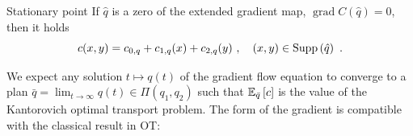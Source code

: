 \documentclass[xcolor=svgnames]{beamer}
\DeclareMathOperator{\grad}{grad}
\begin{document}
\begin{frame}
\begin{block}{Stationary point} If $\hat q$ is a zero of the extended gradient map, $\grad C(\hat q) = 0$, then it holds
\begin{equation*}
  c(x,y) = c_{0,q} + c_{1,q}(x) + c_{2,q}(y) \ , \quad  (x,y) \in \operatorname{Supp}\left(\hat q\right) \ .
\end{equation*}
\end{block}

We expect any solution $t \mapsto q(t)$ of the gradient flow equation to converge to a plan $\bar q = \lim_{t \to \infty} q(t) \in \Pi(q_1,q_2)$ such that $\operatorname{\mathbb E}_{\bar q}\left[c\right]$ is the value of the Kantorovich optimal transport problem. The form of the gradient is compatible with the classical result in OT:

\end{frame}

\end{document}

